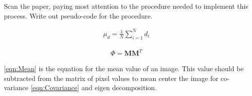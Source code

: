 \documentclass{tufte-handout}
\begin{document}
\bex
\item Scan the paper, paying most attention to the procedure needed to implement this process. Write out pseudo-code for the procedure. %
\eex

\begin{align}
 \mu_{d} = \frac{1}{N} \sum_{i=1}^{N} d_{i} \label{eqn:Mean}
\end{align}

\begin{align}
\Phi = \mathbf{MM}^{T} \label{eqn:Covariance}
\end{align}

\eqref{eqn:Mean} is the equation for the mean value of an image. This value should be subtracted from the matrix of pixel values to mean center the image for co-variance \eqref{eqn:Covariance} and eigen decomposition.


\end{document}
